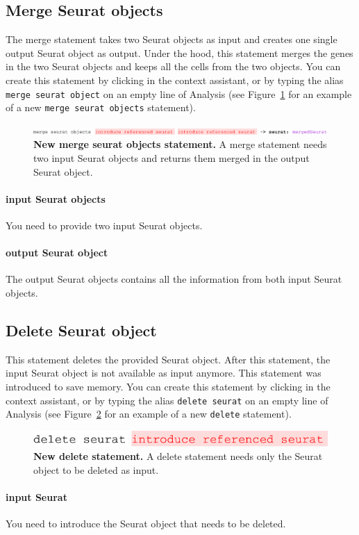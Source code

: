 \subsection{Merge Seurat objects}
The merge statement takes two Seurat objects as input and creates one single output Seurat
object as output. Under the hood, this statement merges the genes in the two Seurat objects
and keeps all the cells from the two objects.
You can create this statement by clicking  in the context assistant, or by typing
the alias \texttt{merge seurat object} on an empty line of Analysis (see Figure~\ref{fig:MergeSeurat}
for an example of a new \texttt{merge seurat objects} statement).

\begin{figure}[h!tbp]
  \centering
    \includegraphics[width=\figWidthWide]{figures/MergeSeurat.pdf}
    \caption[New merge seurat objects statement.]{\textbf{New merge seurat objects statement.} A merge statement
    needs two input Seurat objects and returns them merged in the output Seurat object.}
\label{fig:MergeSeurat}
\end{figure}

\paragraph{input Seurat objects} You need to provide two input Seurat objects.

\paragraph{output Seurat object} The output Seurat objects contains all the information
from both input Seurat objects.

\subsection{Delete Seurat object}
This statement deletes the provided Seurat object. After this statement, the input Seurat
object is not available as input anymore. This statement was introduced to save memory.
You can create this statement by clicking
 in the context assistant, or by typing
the alias \texttt{delete seurat} on an empty line of Analysis (see Figure~\ref{fig:DeleteSeurat}
for an example of a new \texttt{delete} statement).

\begin{figure}
  \centering
    \includegraphics[width=\figWidthTiny]{figures/DeleteSeurat.pdf}
    \caption[New delete statement.]{\textbf{New delete statement.} A delete statement needs only the
    Seurat object to be deleted as input.}
\label{fig:DeleteSeurat}
\end{figure}

\paragraph{input Seurat} You need to introduce the Seurat object that needs to be deleted.
